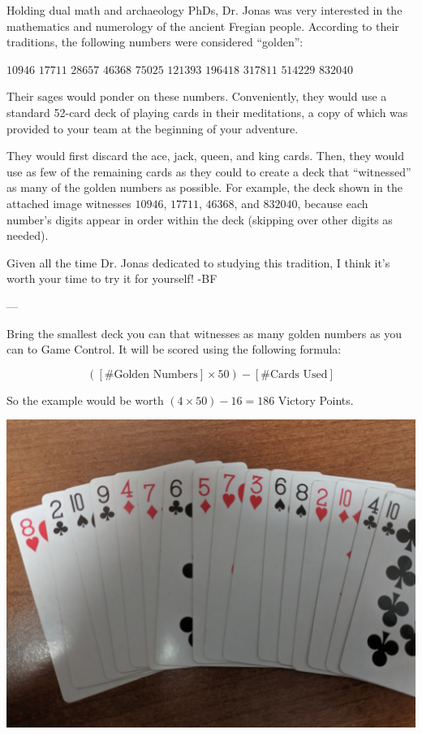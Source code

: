 Holding dual math and archaeology PhDs, Dr. Jonas was very interested in the
mathematics and numerology of the ancient Fregian people. According to
their traditions, the following numbers were considered ``golden'':

\(10946\)\hfill
\(17711\)\hfill
\(28657\)\hfill
\(46368\)\hfill
\(75025\)\hfill
\(121393\)\hfill
\(196418\)\hfill
\(317811\)\hfill
\(514229\)\hfill
\(832040\)

Their sages would ponder on these numbers. Conveniently, they would
use a standard 52-card deck of playing cards in their meditations,
a copy of which was provided to your team at the beginning of your adventure.

They would first discard the ace, jack, queen, and king cards. Then, they
would use as few of the remaining cards as they could to create a deck that 
``witnessed'' as many of the golden numbers as possible. For example, the deck shown in
the attached image witnesses \(10946\), \(17711\), \(46368\),
and \(832040\), because each number's digits appear in order within the deck
(skipping over other digits as needed).

Given all the time Dr. Jonas dedicated to studying this tradition, I think it's worth your
time to try it for yourself! -BF

---

Bring the smallest deck you can that witnesses
as many golden numbers as you can to Game Control. It will be scored using
the following formula:

\[([\# \textrm{Golden Numbers}]\times 50)-[\# \textrm{Cards Used}]\]

So the example would be worth \((4\times 50)-16=186\) Victory Points.

\centerline{\includegraphics[width=0.5\linewidth]{assets/cards.jpg}}
